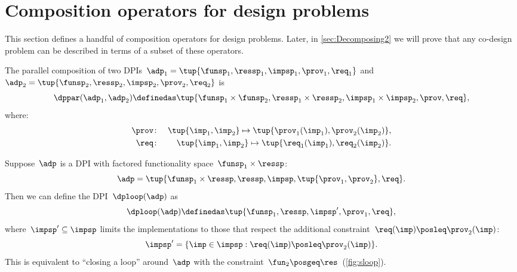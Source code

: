 

\section{Composition operators for design problems}

This section defines a handful of composition operators for design
problems. Later, in \cref{sec:Decomposing2} we will prove that any co-design
problem can be described in terms of a subset of these operators.

\label{sec:threeoperators}

\begin{definition}[$\dppar$]
    \label{def:parallel}
    The parallel composition of two DPIs~$\adp_{1}=\tup{\funsp_{1},\ressp_{1},\impsp_{1},\prov_{1},\req_{1}}$
    and~$\adp_{2}=\tup{\funsp_{2},\ressp_{2},\impsp_{2},\prov_{2},
        \req_{2}}$ is
    \begin{equation*}
        \dppar(\adp_{1},\adp_{2})\definedas\tup{\funsp_{1}\times\funsp_{2},\ressp_{1}\times\ressp_{2},\impsp_{1}\times\impsp_{2},\prov,\req} ,
    \end{equation*}
    where:
    \begin{eqnarray}
        \prov & \colon & \tup{ \imp_{1},\imp_{2}} \mapsto \tup{\prov_{1}(\imp_{1}),\prov_{2}(\imp_{2})} ,\label{eq:dppar-exec}\\
        \req & \colon & \tup{ \imp_{1},\imp_{2}}\mapsto\tup{\req_{1}(\imp_{1}),\req_{2}(\imp_{2})} .\nonumber
    \end{eqnarray}

\end{definition}


\begin{definition}[$\dploop$]
    \label{def:dp_loop}Suppose~$\adp$ is a DPI with factored functionality
    space~$\funsp_{1}\times\ressp$:
    \begin{equation*}
        \adp=\tup{ \funsp_{1}\times\ressp,\ressp,\impsp,\tup{ \prov_{1},\prov_{2}} ,\req}.
    \end{equation*}
    Then we can define the DPI~$\dploop(\adp)$ as
    \begin{equation*}
        \dploop(\adp)\definedas\tup{ \funsp_{1},\ressp,\impsp',\prov_{1},\req} ,
    \end{equation*}
    where~$\impsp'\subseteq\impsp$ limits the implementations to those
    that respect the additional constraint~$\req(\imp)\posleq\prov_{2}(\imp)$:
    \begin{equation*}
        \impsp'=\{\imp\in\impsp:\req(\imp)\posleq\prov_{2}(\imp)\}.
    \end{equation*}
    This is equivalent to ``closing a loop'' around~$\adp$ with
    the constraint~$\fun_{2}\posgeq\res$~(\cref{fig:sloop}).
\end{definition}

